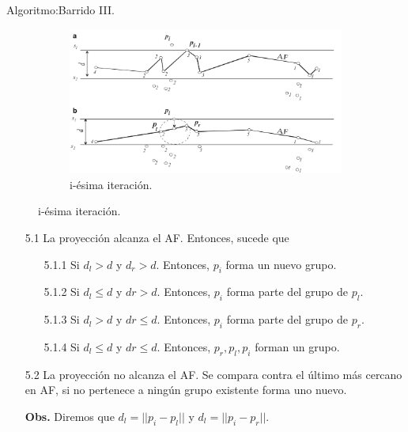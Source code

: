 \begin{frame}[fragile]{Algoritmo:}{Barrido III.}
  \begin{figure}
    \centering
    \begin{subfigure}[b]{0.6\textwidth}
      \includegraphics[width=\textwidth]{./Imagenes/Barrido.png}
      \caption*{i-ésima iteración.}
    \end{subfigure}
  \end{figure}
  \begin{enumerate}
  \item[5.1] La proyección alcanza el AF. Entonces, sucede que
    \begin{enumerate}
    \item[5.1.1] Si $d_l > d$ y $d_r > d$. Entonces, $p_i$ forma un nuevo grupo.
    \item[5.1.2] Si $d_l \leq d$ y $dr > d$. Entonces, $p_i$ forma parte del grupo de $p_l$.
    \item[5.1.3] Si $d_l > d$ y $dr \leq d$. Entonces, $p_i$ forma parte del grupo de $p_r$.
    \item[5.1.4] Si $d_l \leq d$ y $dr \leq d$. Entonces, $p_r, p_l, p_i$ forman un grupo.
    \end{enumerate}
  \item[5.2] La proyección no alcanza el AF. Se compara contra el último más cercano en AF, si
    no pertenece a ningún grupo existente forma uno nuevo.
    
    \textbf{Obs.} Diremos que $d_l = ||p_i - p_l||$ y $d_l = ||p_i - p_r||.$
  \end{enumerate}
\end{frame}
